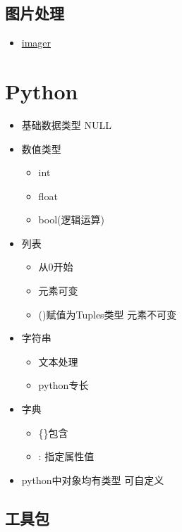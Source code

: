 \documentclass[]{book}
\providecommand{\tightlist}{%
  \setlength{\itemsep}{0pt}\setlength{\parskip}{0pt}}
\begin{document}
\subsection{图片处理}

\begin{itemize}
\tightlist
\item
  \href{https://github.com/dahtah/imager}{imager}
\end{itemize}

\hypertarget{python}{%
\section{Python}\label{python}}

\begin{itemize}
\tightlist
\item
  基础数据类型 NULL
\item
  数值类型

  \begin{itemize}
  \tightlist
  \item
    int
  \item
    float
  \item
    bool(逻辑运算)
  \end{itemize}
\item
  列表

  \begin{itemize}
  \tightlist
  \item
    从0开始
  \item
    元素可变
  \item
    ()赋值为Tuples类型 元素不可变
  \end{itemize}
\item
  字符串

  \begin{itemize}
  \tightlist
  \item
    文本处理
  \item
    python专长
  \end{itemize}
\item
  字典

  \begin{itemize}
  \tightlist
  \item
    \{\}包含
  \item
    : 指定属性值
  \end{itemize}
\item
  python中对象均有类型 可自定义
\end{itemize}

\subsection{工具包}
\end{document}
